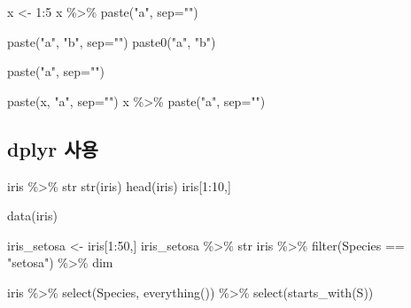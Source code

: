 \documentclass[
]{book}
\newenvironment{Shaded}{\begin{snugshade}}{\end{snugshade}}
\newcommand{\AttributeTok}[1]{\textcolor[rgb]{0.77,0.63,0.00}{#1}}
\newcommand{\DecValTok}[1]{\textcolor[rgb]{0.00,0.00,0.81}{#1}}
\newcommand{\FunctionTok}[1]{\textcolor[rgb]{0.00,0.00,0.00}{#1}}
\newcommand{\NormalTok}[1]{#1}
\newcommand{\OtherTok}[1]{\textcolor[rgb]{0.56,0.35,0.01}{#1}}
\newcommand{\SpecialCharTok}[1]{\textcolor[rgb]{0.00,0.00,0.00}{#1}}
\newcommand{\StringTok}[1]{\textcolor[rgb]{0.31,0.60,0.02}{#1}}
\begin{document}
\begin{Shaded}
\begin{Highlighting}[]
\NormalTok{x }\OtherTok{\textless{}{-}} \DecValTok{1}\SpecialCharTok{:}\DecValTok{5}
\NormalTok{x }\SpecialCharTok{\%\textgreater{}\%} \FunctionTok{paste}\NormalTok{(}\StringTok{"a"}\NormalTok{, }\AttributeTok{sep=}\StringTok{""}\NormalTok{)}


\FunctionTok{paste}\NormalTok{(}\StringTok{"a"}\NormalTok{, }\StringTok{"b"}\NormalTok{, }\AttributeTok{sep=}\StringTok{""}\NormalTok{)}
\FunctionTok{paste0}\NormalTok{(}\StringTok{"a"}\NormalTok{, }\StringTok{"b"}\NormalTok{)}

\FunctionTok{paste}\NormalTok{(}\StringTok{"a"}\NormalTok{, }\AttributeTok{sep=}\StringTok{""}\NormalTok{)}


\FunctionTok{paste}\NormalTok{(x, }\StringTok{"a"}\NormalTok{, }\AttributeTok{sep=}\StringTok{""}\NormalTok{)}
\NormalTok{x }\SpecialCharTok{\%\textgreater{}\%} \FunctionTok{paste}\NormalTok{(}\StringTok{"a"}\NormalTok{, }\AttributeTok{sep=}\StringTok{""}\NormalTok{)}
\end{Highlighting}
\end{Shaded}

\hypertarget{dplyr-uxc0acuxc6a9}{%
\subsection{dplyr 사용}\label{dplyr-uxc0acuxc6a9}}

\begin{Shaded}
\begin{Highlighting}[]
\NormalTok{iris }\SpecialCharTok{\%\textgreater{}\%}\NormalTok{ str}
\FunctionTok{str}\NormalTok{(iris)}
\FunctionTok{head}\NormalTok{(iris)}
\NormalTok{iris[}\DecValTok{1}\SpecialCharTok{:}\DecValTok{10}\NormalTok{,]}

\FunctionTok{data}\NormalTok{(iris)}

\NormalTok{iris\_setosa }\OtherTok{\textless{}{-}}\NormalTok{ iris[}\DecValTok{1}\SpecialCharTok{:}\DecValTok{50}\NormalTok{,]}
\NormalTok{iris\_setosa }\SpecialCharTok{\%\textgreater{}\%}\NormalTok{ str}
\NormalTok{iris }\SpecialCharTok{\%\textgreater{}\%} 
  \FunctionTok{filter}\NormalTok{(Species }\SpecialCharTok{==} \StringTok{"setosa"}\NormalTok{) }\SpecialCharTok{\%\textgreater{}\%} 
\NormalTok{  dim }
  
\NormalTok{iris }\SpecialCharTok{\%\textgreater{}\%} 
  \FunctionTok{select}\NormalTok{(Species, }\FunctionTok{everything}\NormalTok{()) }\SpecialCharTok{\%\textgreater{}\%} 
  \FunctionTok{select}\NormalTok{(}\FunctionTok{starts\_with}\NormalTok{(}\StringTok{\textquotesingle{}S\textquotesingle{}}\NormalTok{))}
\end{Highlighting}
\end{Shaded}
\end{document}
